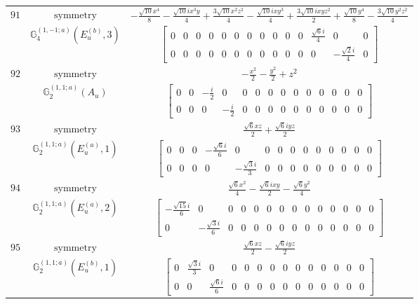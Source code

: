 \documentclass[fleqn,8pt,landscape]{jsarticle}
\begin{document}
\begin{longtable}{ccc}
$ 91 $ & $ \text{symmetry} $ & $ - \frac{\sqrt{10} x^{4}}{8} - \frac{\sqrt{10} i x^{3} y}{4} + \frac{3 \sqrt{10} x^{2} z^{2}}{4} - \frac{\sqrt{10} i x y^{3}}{4} + \frac{3 \sqrt{10} i x y z^{2}}{2} + \frac{\sqrt{10} y^{4}}{8} - \frac{3 \sqrt{10} y^{2} z^{2}}{4} $ \\
$  $ & $ \mathbb{G}_{4}^{(1,-1;a)}(E_{u}^{(b)},3) $ & $ \begin{bmatrix} 0 & 0 & 0 & 0 & 0 & 0 & 0 & 0 & 0 & 0 & 0 & \frac{\sqrt{6} i}{4} & 0 & 0 \\ 0 & 0 & 0 & 0 & 0 & 0 & 0 & 0 & 0 & 0 & 0 & 0 & - \frac{\sqrt{2} i}{4} & 0 \end{bmatrix} $ \\ \hline
$ 92 $ & $ \text{symmetry} $ & $ - \frac{x^{2}}{2} - \frac{y^{2}}{2} + z^{2} $ \\
$  $ & $ \mathbb{G}_{2}^{(1,1;a)}(A_{u}) $ & $ \begin{bmatrix} 0 & 0 & - \frac{i}{2} & 0 & 0 & 0 & 0 & 0 & 0 & 0 & 0 & 0 & 0 & 0 \\ 0 & 0 & 0 & - \frac{i}{2} & 0 & 0 & 0 & 0 & 0 & 0 & 0 & 0 & 0 & 0 \end{bmatrix} $ \\ \hline
$ 93 $ & $ \text{symmetry} $ & $ \frac{\sqrt{6} x z}{2} + \frac{\sqrt{6} i y z}{2} $ \\
$  $ & $ \mathbb{G}_{2}^{(1,1;a)}(E_{u}^{(a)},1) $ & $ \begin{bmatrix} 0 & 0 & 0 & - \frac{\sqrt{6} i}{6} & 0 & 0 & 0 & 0 & 0 & 0 & 0 & 0 & 0 & 0 \\ 0 & 0 & 0 & 0 & - \frac{\sqrt{3} i}{3} & 0 & 0 & 0 & 0 & 0 & 0 & 0 & 0 & 0 \end{bmatrix} $ \\ \hline
$ 94 $ & $ \text{symmetry} $ & $ \frac{\sqrt{6} x^{2}}{4} - \frac{\sqrt{6} i x y}{2} - \frac{\sqrt{6} y^{2}}{4} $ \\
$  $ & $ \mathbb{G}_{2}^{(1,1;a)}(E_{u}^{(a)},2) $ & $ \begin{bmatrix} - \frac{\sqrt{15} i}{6} & 0 & 0 & 0 & 0 & 0 & 0 & 0 & 0 & 0 & 0 & 0 & 0 & 0 \\ 0 & - \frac{\sqrt{3} i}{6} & 0 & 0 & 0 & 0 & 0 & 0 & 0 & 0 & 0 & 0 & 0 & 0 \end{bmatrix} $ \\ \hline
$ 95 $ & $ \text{symmetry} $ & $ \frac{\sqrt{6} x z}{2} - \frac{\sqrt{6} i y z}{2} $ \\
$  $ & $ \mathbb{G}_{2}^{(1,1;a)}(E_{u}^{(b)},1) $ & $ \begin{bmatrix} 0 & \frac{\sqrt{3} i}{3} & 0 & 0 & 0 & 0 & 0 & 0 & 0 & 0 & 0 & 0 & 0 & 0 \\ 0 & 0 & \frac{\sqrt{6} i}{6} & 0 & 0 & 0 & 0 & 0 & 0 & 0 & 0 & 0 & 0 & 0 \end{bmatrix} $ \\ \hline

\end{longtable}
\end{document}
